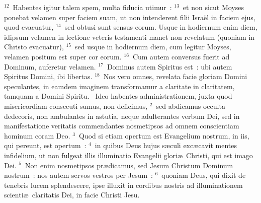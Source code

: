 ${}^{12}$~Habentes igitur talem spem, multa fiducia utimur~:
${}^{13}$~et non sicut Moyses ponebat velamen super faciem suam, ut non intenderent filii Isra\"el in faciem ejus, quod evacuatur,
${}^{14}$~sed obtusi sunt sensus eorum. Usque in hodiernum enim diem, idipsum velamen in lectione veteris testamenti manet non revelatum (quoniam in Christo evacuatur),
${}^{15}$~sed usque in hodiernum diem, cum legitur Moyses, velamen positum est super cor eorum.
${}^{16}$~Cum autem conversus fuerit ad Dominum, auferetur velamen.
${}^{17}$~Dominus autem Spiritus est~: ubi autem Spiritus Domini, ibi libertas.
${}^{18}$~Nos vero omnes, revelata facie gloriam Domini speculantes, in eamdem imaginem transformamur a claritate in claritatem, tamquam a Domini Spiritu.
~Ideo habentes administrationem, juxta quod misericordiam consecuti sumus, non deficimus,
${}^{2}$~sed abdicamus occulta dedecoris, non ambulantes in astutia, neque adulterantes verbum Dei, sed in manifestatione veritatis commendantes nosmetipsos ad omnem conscientiam hominum coram Deo.
${}^{3}$~Quod si etiam opertum est Evangelium nostrum, in iis, qui pereunt, est opertum~:
${}^{4}$~in quibus Deus hujus s\ae culi exc\ae cavit mentes infidelium, ut non fulgeat illis illuminatio Evangelii glori\ae\ Christi, qui est imago Dei.
${}^{5}$~Non enim nosmetipsos pr\ae dicamus, sed Jesum Christum Dominum nostrum~: nos autem servos vestros per Jesum~:
${}^{6}$~quoniam Deus, qui dixit de tenebris lucem splendescere, ipse illuxit in cordibus nostris ad illuminationem scienti\ae\ claritatis Dei, in facie Christi Jesu.


